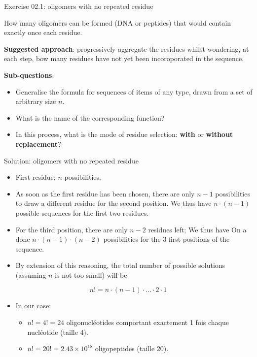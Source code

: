 \documentclass[ignorenonframetext,]{beamer}
\providecommand{\tightlist}{%
  \setlength{\itemsep}{0pt}\setlength{\parskip}{0pt}}
\begin{document}
\begin{frame}{Exercise 02.1: oligomers with no repeated residue}
\protect\hypertarget{exercise-02.1-oligomers-with-no-repeated-residue}{}

How many oligomers can be formed (DNA or peptides) that would contain
exactly once each residue.

\textbf{Suggested approach}: progressively aggregate the residues whilst
wondering, at each step, bow many residues have not yet been
incoroporated in the sequence.

\textbf{Sub-questions}:

\begin{itemize}
\item
  Generalise the formula for sequences of items of any type, drawn from
  a set of arbitrary size \(n\).
\item
  What is the name of the corresponding function?
\item
  In this process, what is the mode of residue selection: \textbf{with}
  or \textbf{without replacement}?
\end{itemize}

\end{frame}

\begin{frame}{Solution: oligomers with no repeated residue}
\protect\hypertarget{solution-oligomers-with-no-repeated-residue}{}

\begin{itemize}
\tightlist
\item
  First residue: \(n\) possibilities.
\item
  As soon as the first residue has been chosen, there are only \(n-1\)
  possibilities to draw a different residue for the second position. We
  thus have \(n \cdot (n-1)\) possible sequences for the first two
  residues.
\item
  For the third position, there are only \(n-2\) residues left; We thus
  have On a donc \(n \cdot (n-1) \cdot (n-2)\) possibilities for the 3
  first positions of the sequence.
\item
  By extension of this reasoning, the total number of possible solutions
  (assuming \(n\) is not too small) will be
\end{itemize}

\[n! = n \cdot (n-1) \cdot \ldots \cdot 2 \cdot 1\]

\begin{itemize}
\item
  In our case:

  \begin{itemize}
  \tightlist
  \item
    \(n! = 4! = 24\) oligonucléotides comportant exactement 1 fois
    chaque nucléotide (taille 4).
  \item
    \(n! = 20! = \ensuremath{2.43\times 10^{18}}\) oligopeptides (taille
    20).
  \end{itemize}
\end{itemize}

\end{frame}
\end{document}
